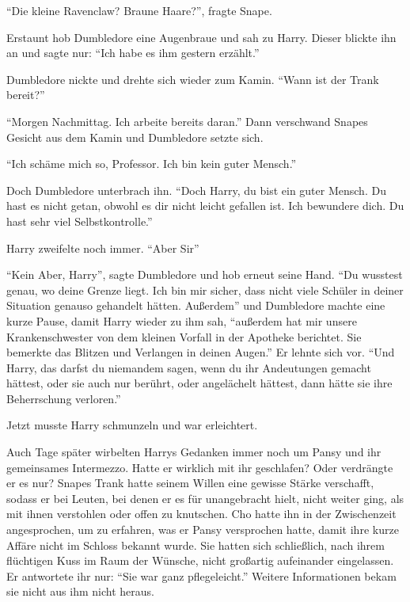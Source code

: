 \enquote{Die kleine Ravenclaw? Braune Haare?}, fragte Snape.

Erstaunt hob Dumbledore eine Augenbraue und sah zu Harry. Dieser blickte ihn an und sagte nur: \enquote{Ich habe es ihm gestern erzählt.}

Dumbledore nickte und drehte sich wieder zum Kamin. \enquote{Wann ist der Trank bereit?}

\enquote{Morgen Nachmittag. Ich arbeite bereits daran.} Dann verschwand Snapes Gesicht aus dem Kamin und Dumbledore setzte sich.

\enquote{Ich schäme mich so, Professor. Ich bin kein guter Mensch.}

Doch Dumbledore unterbrach ihn. \enquote{Doch Harry, du bist ein guter Mensch. Du hast es nicht getan, obwohl es dir nicht leicht gefallen ist. Ich bewundere dich. Du hast sehr viel Selbstkontrolle.}

Harry zweifelte noch immer. \enquote{Aber Sir\abs}

\enquote{Kein Aber, Harry}, sagte Dumbledore und hob erneut seine Hand. \enquote{Du wusstest genau, wo deine Grenze liegt. Ich bin mir sicher, dass nicht viele Schüler in deiner Situation genauso gehandelt hätten. Außerdem\abs} und Dumbledore machte eine kurze Pause, damit Harry wieder zu ihm sah, \enquote{außerdem hat mir unsere Krankenschwester von dem kleinen Vorfall in der Apotheke berichtet. Sie bemerkte das Blitzen und Verlangen in deinen Augen.} Er lehnte sich vor. \enquote{Und Harry, das darfst du niemandem sagen, wenn du ihr Andeutungen gemacht hättest, oder sie auch nur berührt, oder angelächelt hättest, dann hätte sie ihre Beherrschung verloren.}

Jetzt musste Harry schmunzeln und war erleichtert.

Auch Tage später wirbelten Harrys Gedanken immer noch um Pansy und ihr gemeinsames Intermezzo. Hatte er wirklich mit ihr geschlafen? Oder verdrängte er es nur? Snapes Trank hatte seinem Willen eine gewisse Stärke verschafft, sodass er bei Leuten, bei denen er es für unangebracht hielt, nicht weiter ging, als mit ihnen verstohlen oder offen zu knutschen. Cho hatte ihn in der Zwischenzeit angesprochen, um zu erfahren, was er Pansy versprochen hatte, damit ihre kurze Affäre nicht im Schloss bekannt wurde. Sie hatten sich schließlich, nach ihrem flüchtigen Kuss im Raum der Wünsche, nicht großartig aufeinander eingelassen. Er antwortete ihr nur: \enquote{Sie war ganz pflegeleicht.} Weitere Informationen bekam sie nicht aus ihm nicht heraus.

